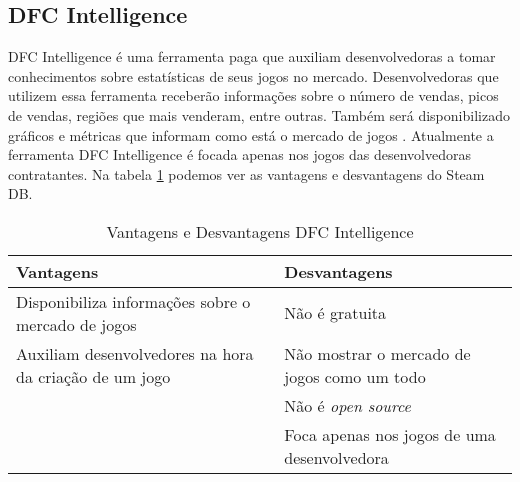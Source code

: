 \subsection{DFC Intelligence}
DFC Intelligence é uma ferramenta paga que auxiliam desenvolvedoras a tomar conhecimentos sobre estatísticas de seus jogos no mercado. Desenvolvedoras que utilizem essa ferramenta receberão informações sobre o número de vendas, picos de vendas, regiões que mais venderam, entre outras. Também será disponibilizado gráficos e métricas que informam como está o mercado de jogos \cite{dfc_intelligence}. Atualmente a ferramenta DFC Intelligence é focada apenas nos jogos das desenvolvedoras contratantes. Na tabela \ref{table:dfc_intelligence} podemos ver as vantagens e desvantagens do Steam DB.
\begin{table} [H]
\centering
\begin{tabular}{|p{7cm}|p{7cm}|}
\hline \textbf{Vantagens} & \textbf{Desvantagens} \\
\hline Disponibiliza informações sobre o mercado de jogos & Não é gratuita \\
\hline Auxiliam desenvolvedores na hora da criação de um jogo & Não mostrar o mercado de jogos como um todo \\
\hline & Não é \textit{open source} \\
\hline & Foca apenas nos jogos de uma desenvolvedora \\
\hline
\end{tabular}
\caption{Vantagens e Desvantagens DFC Intelligence}
\label{table:dfc_intelligence}
\end{table}